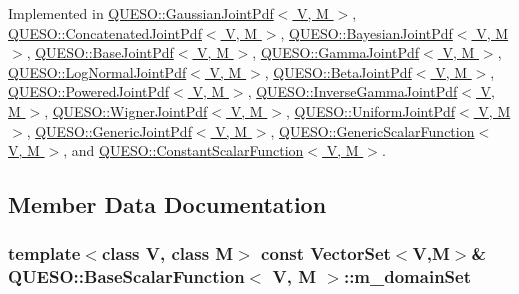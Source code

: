Implemented in \hyperlink{class_q_u_e_s_o_1_1_gaussian_joint_pdf_a14207045679234c5112974be5445b30d}{Q\-U\-E\-S\-O\-::\-Gaussian\-Joint\-Pdf$<$ V, M $>$}, \hyperlink{class_q_u_e_s_o_1_1_concatenated_joint_pdf_aca499666e5c3d3d26c562492a15ab112}{Q\-U\-E\-S\-O\-::\-Concatenated\-Joint\-Pdf$<$ V, M $>$}, \hyperlink{class_q_u_e_s_o_1_1_bayesian_joint_pdf_a98e54ee24452e2477469a0c84eecbfca}{Q\-U\-E\-S\-O\-::\-Bayesian\-Joint\-Pdf$<$ V, M $>$}, \hyperlink{class_q_u_e_s_o_1_1_base_joint_pdf_aaeb1d91fd791399a502f451b07bb1bfe}{Q\-U\-E\-S\-O\-::\-Base\-Joint\-Pdf$<$ V, M $>$}, \hyperlink{class_q_u_e_s_o_1_1_gamma_joint_pdf_a990337e7c25a4214b15fd71cb6deb384}{Q\-U\-E\-S\-O\-::\-Gamma\-Joint\-Pdf$<$ V, M $>$}, \hyperlink{class_q_u_e_s_o_1_1_log_normal_joint_pdf_a9c31e89ee4abe8f1747e50c8d472a94d}{Q\-U\-E\-S\-O\-::\-Log\-Normal\-Joint\-Pdf$<$ V, M $>$}, \hyperlink{class_q_u_e_s_o_1_1_beta_joint_pdf_a713d655107dd51eac9d1c19630359a06}{Q\-U\-E\-S\-O\-::\-Beta\-Joint\-Pdf$<$ V, M $>$}, \hyperlink{class_q_u_e_s_o_1_1_powered_joint_pdf_addcc8c32b3dc30d22fb1e4a8350a14e3}{Q\-U\-E\-S\-O\-::\-Powered\-Joint\-Pdf$<$ V, M $>$}, \hyperlink{class_q_u_e_s_o_1_1_inverse_gamma_joint_pdf_a08dbbb7054026fcf4d429870cbe5d36f}{Q\-U\-E\-S\-O\-::\-Inverse\-Gamma\-Joint\-Pdf$<$ V, M $>$}, \hyperlink{class_q_u_e_s_o_1_1_wigner_joint_pdf_a64afe5e7a7974fc91b4394e81ba4da55}{Q\-U\-E\-S\-O\-::\-Wigner\-Joint\-Pdf$<$ V, M $>$}, \hyperlink{class_q_u_e_s_o_1_1_uniform_joint_pdf_a80858abd7ca07ed42b9e9f0e4c92b3d2}{Q\-U\-E\-S\-O\-::\-Uniform\-Joint\-Pdf$<$ V, M $>$}, \hyperlink{class_q_u_e_s_o_1_1_generic_joint_pdf_a566150d033ce9c09a22c6f271a7155a8}{Q\-U\-E\-S\-O\-::\-Generic\-Joint\-Pdf$<$ V, M $>$}, \hyperlink{class_q_u_e_s_o_1_1_generic_scalar_function_a0e93bae1ceb42049353e798a8866fd77}{Q\-U\-E\-S\-O\-::\-Generic\-Scalar\-Function$<$ V, M $>$}, and \hyperlink{class_q_u_e_s_o_1_1_constant_scalar_function_acf0fb2fe0c7dbe30bec6782c94e2a9e3}{Q\-U\-E\-S\-O\-::\-Constant\-Scalar\-Function$<$ V, M $>$}.



\subsection{Member Data Documentation}
\hypertarget{class_q_u_e_s_o_1_1_base_scalar_function_a67696e86211197938c72cd11863f5cf8}{
\subsubsection[{m\-\_\-domain\-Set}]{\setlength{\rightskip}{0pt plus 5cm}template$<$class V, class M$>$ const {\bf Vector\-Set}$<$V,M$>$\& {\bf Q\-U\-E\-S\-O\-::\-Base\-Scalar\-Function}$<$ V, M $>$\-::m\-\_\-domain\-Set\hspace{0.3cm}{\ttfamily [protected]}}}\label{class_q_u_e_s_o_1_1_base_scalar_function_a67696e86211197938c72cd11863f5cf8}


